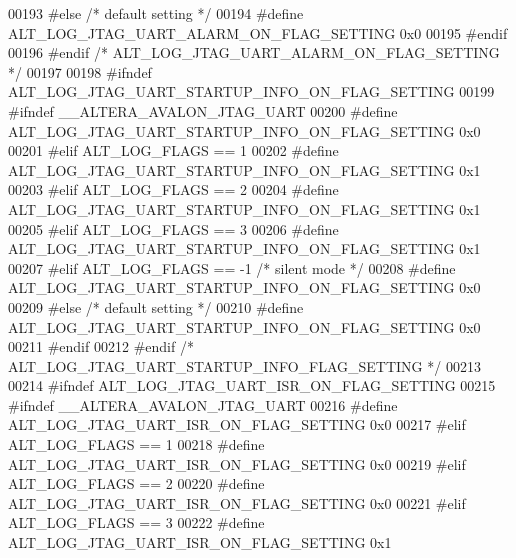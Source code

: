 \begin{DoxyCode}
{{{{00193 \textcolor{preprocessor}{        #else }\textcolor{comment}{/* default setting */}\textcolor{preprocessor}{}
00194 \textcolor{preprocessor}{            #define ALT\_LOG\_JTAG\_UART\_ALARM\_ON\_FLAG\_SETTING 0x0}
00195 \textcolor{preprocessor}{        #endif}
00196 \textcolor{preprocessor}{    #endif }\textcolor{comment}{/* ALT\_LOG\_JTAG\_UART\_ALARM\_ON\_FLAG\_SETTING */}\textcolor{preprocessor}{}
00197 
00198 \textcolor{preprocessor}{    #ifndef ALT\_LOG\_JTAG\_UART\_STARTUP\_INFO\_ON\_FLAG\_SETTING}
00199 \textcolor{preprocessor}{        #ifndef \_\_ALTERA\_AVALON\_JTAG\_UART }
00200 \textcolor{preprocessor}{            #define ALT\_LOG\_JTAG\_UART\_STARTUP\_INFO\_ON\_FLAG\_SETTING 0x0}
00201 \textcolor{preprocessor}{        #elif ALT\_LOG\_FLAGS == 1}
00202 \textcolor{preprocessor}{            #define ALT\_LOG\_JTAG\_UART\_STARTUP\_INFO\_ON\_FLAG\_SETTING 0x1}
00203 \textcolor{preprocessor}{        #elif ALT\_LOG\_FLAGS == 2}
00204 \textcolor{preprocessor}{            #define ALT\_LOG\_JTAG\_UART\_STARTUP\_INFO\_ON\_FLAG\_SETTING 0x1}
00205 \textcolor{preprocessor}{        #elif ALT\_LOG\_FLAGS == 3}
00206 \textcolor{preprocessor}{            #define ALT\_LOG\_JTAG\_UART\_STARTUP\_INFO\_ON\_FLAG\_SETTING 0x1}
00207 \textcolor{preprocessor}{        #elif ALT\_LOG\_FLAGS == -1 }\textcolor{comment}{/* silent mode */}\textcolor{preprocessor}{}
00208 \textcolor{preprocessor}{            #define ALT\_LOG\_JTAG\_UART\_STARTUP\_INFO\_ON\_FLAG\_SETTING 0x0}
00209 \textcolor{preprocessor}{        #else }\textcolor{comment}{/* default setting */}\textcolor{preprocessor}{}
00210 \textcolor{preprocessor}{            #define ALT\_LOG\_JTAG\_UART\_STARTUP\_INFO\_ON\_FLAG\_SETTING 0x0}
00211 \textcolor{preprocessor}{        #endif}
00212 \textcolor{preprocessor}{    #endif }\textcolor{comment}{/* ALT\_LOG\_JTAG\_UART\_STARTUP\_INFO\_FLAG\_SETTING */}\textcolor{preprocessor}{}
00213 
00214 \textcolor{preprocessor}{    #ifndef ALT\_LOG\_JTAG\_UART\_ISR\_ON\_FLAG\_SETTING}
00215 \textcolor{preprocessor}{        #ifndef \_\_ALTERA\_AVALON\_JTAG\_UART }
00216 \textcolor{preprocessor}{            #define ALT\_LOG\_JTAG\_UART\_ISR\_ON\_FLAG\_SETTING 0x0}
00217 \textcolor{preprocessor}{        #elif ALT\_LOG\_FLAGS == 1}
00218 \textcolor{preprocessor}{            #define ALT\_LOG\_JTAG\_UART\_ISR\_ON\_FLAG\_SETTING 0x0}
00219 \textcolor{preprocessor}{        #elif ALT\_LOG\_FLAGS == 2}
00220 \textcolor{preprocessor}{            #define ALT\_LOG\_JTAG\_UART\_ISR\_ON\_FLAG\_SETTING 0x0}
00221 \textcolor{preprocessor}{        #elif ALT\_LOG\_FLAGS == 3}
00222 \textcolor{preprocessor}{            #define ALT\_LOG\_JTAG\_UART\_ISR\_ON\_FLAG\_SETTING 0x1}
}}}}
\end{DoxyCode}
